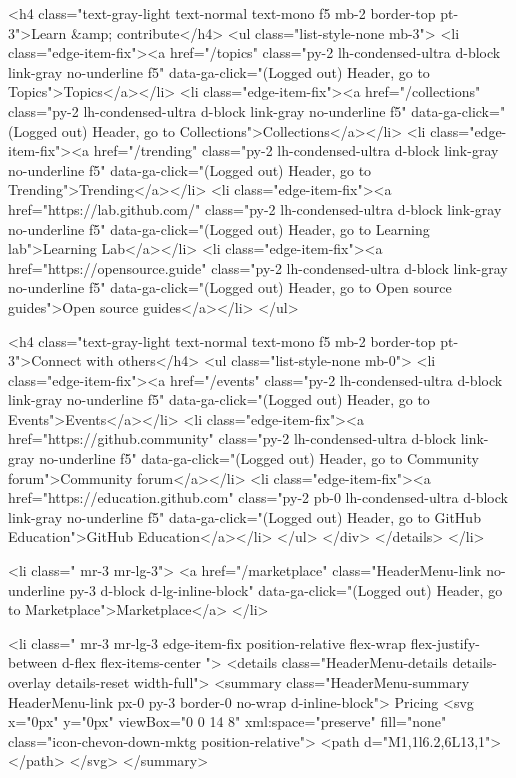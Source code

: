                     <h4 class="text-gray-light text-normal text-mono f5 mb-2  border-top pt-3">Learn &amp; contribute</h4>
                    <ul class="list-style-none mb-3">
                      <li class="edge-item-fix"><a href="/topics" class="py-2 lh-condensed-ultra d-block link-gray no-underline f5" data-ga-click="(Logged out) Header, go to Topics">Topics</a></li>
                      <li class="edge-item-fix"><a href="/collections" class="py-2 lh-condensed-ultra d-block link-gray no-underline f5" data-ga-click="(Logged out) Header, go to Collections">Collections</a></li>
                      <li class="edge-item-fix"><a href="/trending" class="py-2 lh-condensed-ultra d-block link-gray no-underline f5" data-ga-click="(Logged out) Header, go to Trending">Trending</a></li>
                      <li class="edge-item-fix"><a href="https://lab.github.com/" class="py-2 lh-condensed-ultra d-block link-gray no-underline f5" data-ga-click="(Logged out) Header, go to Learning lab">Learning Lab</a></li>
                      <li class="edge-item-fix"><a href="https://opensource.guide" class="py-2 lh-condensed-ultra d-block link-gray no-underline f5" data-ga-click="(Logged out) Header, go to Open source guides">Open source guides</a></li>
                    </ul>

                    <h4 class="text-gray-light text-normal text-mono f5 mb-2  border-top pt-3">Connect with others</h4>
                    <ul class="list-style-none mb-0">
                      <li class="edge-item-fix"><a href="/events" class="py-2 lh-condensed-ultra d-block link-gray no-underline f5" data-ga-click="(Logged out) Header, go to Events">Events</a></li>
                      <li class="edge-item-fix"><a href="https://github.community" class="py-2 lh-condensed-ultra d-block link-gray no-underline f5" data-ga-click="(Logged out) Header, go to Community forum">Community forum</a></li>
                      <li class="edge-item-fix"><a href="https://education.github.com" class="py-2 pb-0 lh-condensed-ultra d-block link-gray no-underline f5" data-ga-click="(Logged out) Header, go to GitHub Education">GitHub Education</a></li>
                    </ul>
                  </div>
                </details>
              </li>

              <li class=" mr-3 mr-lg-3">
                <a href="/marketplace" class="HeaderMenu-link no-underline py-3 d-block d-lg-inline-block" data-ga-click="(Logged out) Header, go to Marketplace">Marketplace</a>
              </li>

              <li class=" mr-3 mr-lg-3 edge-item-fix position-relative flex-wrap flex-justify-between d-flex flex-items-center ">
                <details class="HeaderMenu-details details-overlay details-reset width-full">
                  <summary class="HeaderMenu-summary HeaderMenu-link px-0 py-3 border-0 no-wrap  d-inline-block">
                    Pricing
                    <svg x="0px" y="0px" viewBox="0 0 14 8" xml:space="preserve" fill="none" class="icon-chevon-down-mktg position-relative">
                       <path d="M1,1l6.2,6L13,1"></path>
                    </svg>
                  </summary>

